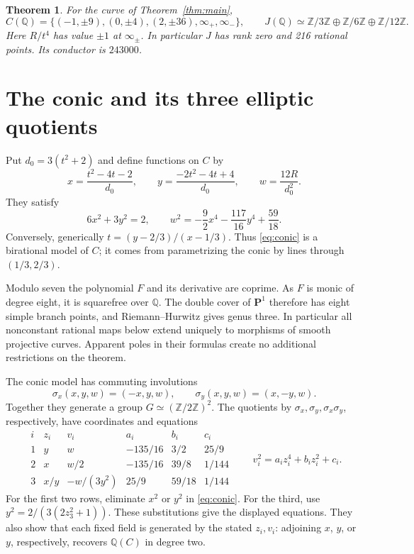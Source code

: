 \documentclass[11pt,reqno]{amsart}
\newtheorem{theorem}{Theorem}
\theoremstyle{remark}
\newcommand{\Q}{\mathbb Q}
\newcommand{\Z}{\mathbb Z}
\begin{document}
\begin{theorem}\label{thm:arithmetic}
For the curve of Theorem~\ref{thm:main},
\[
 C(\Q)=\{(-1,\pm9),(0,\pm4),(2,\pm36),\infty_+,\infty_-\},
 \qquad J(\Q)\simeq\Z/3\Z\oplus\Z/6\Z\oplus\Z/12\Z.
\]
Here \(R/t^4\) has value \(\pm1\) at \(\infty_\pm\).
In particular \(J\) has rank zero and 216 rational points.
Its conductor is \(243000\).
\end{theorem}

\section{The conic and its three elliptic quotients}

Put \(d_0=3(t^2+2)\) and define functions on \(C\) by
\begin{equation}\label{eq:parameter}
 x=\frac{t^2-4t-2}{d_0},\qquad
 y=\frac{-2t^2-4t+4}{d_0},\qquad
 w=\frac{12R}{d_0^2}.
\end{equation}
They satisfy
\begin{equation}\label{eq:conic}
 6x^2+3y^2=2,\qquad
 w^2=-\frac92x^4-\frac{117}{16}y^4+\frac{59}{18}.
\end{equation}
Conversely, generically \(t=(y-2/3)/(x-1/3)\). Thus
\eqref{eq:conic} is a birational model of \(C\); it comes from
parametrizing the conic by lines through \((1/3,2/3)\).

Modulo seven the polynomial \(F\) and its derivative are coprime.
As \(F\) is monic of degree eight, it is squarefree over \(\Q\).
The double cover of \(\mathbf P^1\) therefore has eight simple branch
points, and Riemann--Hurwitz gives genus three. In particular all
nonconstant rational maps below extend uniquely to morphisms of
smooth projective curves. Apparent poles in their formulas create no
additional restrictions on the theorem.

The conic model has commuting involutions
\[
 \sigma_x(x,y,w)=(-x,y,w),\qquad
 \sigma_y(x,y,w)=(x,-y,w).
\]
Together they generate a group \(G\simeq(\Z/2\Z)^2\).
The quotients by \(\sigma_x,\sigma_y,\sigma_x\sigma_y\), respectively,
have coordinates and equations
\begin{equation}\label{eq:rows}
\begin{array}{c|cc|rrr}
 i&z_i&v_i&a_i&b_i&c_i\\ \hline
 1&y&w&-135/16&3/2&25/9\\
 2&x&w/2&-135/16&39/8&1/144\\
 3&x/y&-w/(3y^2)&25/9&59/18&1/144
\end{array}
\qquad
 v_i^2=a_i z_i^4+b_i z_i^2+c_i.
\end{equation}
For the first two rows, eliminate \(x^2\) or \(y^2\) in
\eqref{eq:conic}. For the third, use
\(y^2=2/(3(2z_3^2+1))\). These substitutions give the displayed
equations. They also show that each fixed field is generated by
the stated \(z_i,v_i\): adjoining \(x\), \(y\), or \(y\), respectively,
recovers \(\Q(C)\) in degree two.
\end{document}
